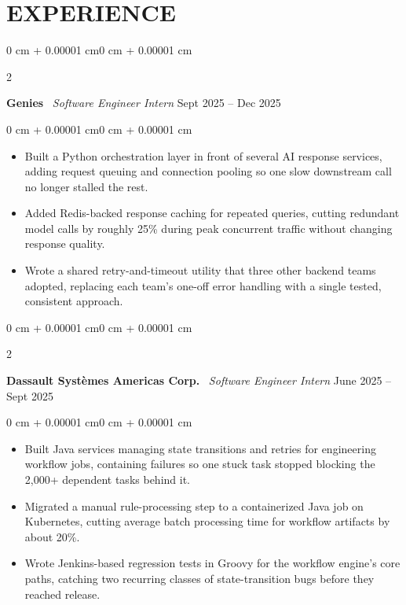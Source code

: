 \documentclass[9pt, letterpaper]{extarticle}
\newenvironment{highlights}{
    \begin{itemize}[topsep=0.0 cm,parsep=0.0 cm,partopsep=0.0 cm,partopsep=0pt,itemsep=0pt,leftmargin=8pt]
}{\end{itemize}}
\newenvironment{onecolentry}{
    \begin{adjustwidth}{0 cm + 0.00001 cm}{0 cm + 0.00001 cm}
}{\end{adjustwidth}}
\newenvironment{twocolentry}[2][]{
    \onecolentry\def\secondColumn{#2}\setcolumnwidth{\fill, 4.5 cm}\begin{paracol}{2}
}{\switchcolumn \raggedleft \secondColumn\end{paracol}\endonecolentry}
\begin{document}
    \section{EXPERIENCE}

    \begin{twocolentry}{Sept 2025 -- Dec 2025}
        \textbf{Genies} \textperiodcentered\ \textit{Software Engineer Intern}
    \end{twocolentry}
    \vspace{0.01 cm}
    \begin{onecolentry}
        \begin{highlights}
            \item Built a Python orchestration layer in front of several AI response services, adding request queuing and connection pooling so one slow downstream call no longer stalled the rest.
            \item Added Redis-backed response caching for repeated queries, cutting redundant model calls by roughly 25\% during peak concurrent traffic without changing response quality.
            \item Wrote a shared retry-and-timeout utility that three other backend teams adopted, replacing each team's one-off error handling with a single tested, consistent approach.
        \end{highlights}
    \end{onecolentry}
    \vspace{0.02 cm}

    \begin{twocolentry}{June 2025 -- Sept 2025}
        \textbf{Dassault Syst\`{e}mes Americas Corp.} \textperiodcentered\ \textit{Software Engineer Intern}
    \end{twocolentry}
    \vspace{0.01 cm}
    \begin{onecolentry}
        \begin{highlights}
            \item Built Java services managing state transitions and retries for engineering workflow jobs, containing failures so one stuck task stopped blocking the 2,000+ dependent tasks behind it.
            \item Migrated a manual rule-processing step to a containerized Java job on Kubernetes, cutting average batch processing time for workflow artifacts by about 20\%.
            \item Wrote Jenkins-based regression tests in Groovy for the workflow engine's core paths, catching two recurring classes of state-transition bugs before they reached release.
        \end{highlights}
    \end{onecolentry}
    \vspace{0.02 cm}
\end{document}

